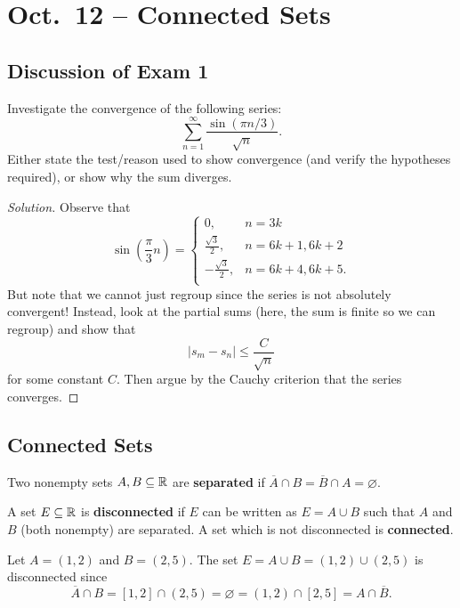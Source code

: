 \chapter{Oct.~12 -- Connected Sets}

\section{Discussion of Exam 1}
\begin{exercise}
  Investigate the convergence of the following series:
  \[\sum_{n=1}^\infty \frac{\sin(\pi n / 3)}{\sqrt{n}}.\]
  Either state the test/reason used to show convergence
  (and verify the hypotheses required), or show why the
  sum diverges.
\end{exercise}

\begin{proof}[Solution]
  Observe that
  \[
    \sin\left(\frac{\pi}{3}n\right) = \begin{cases}
      0, & n = 3k\\
      \frac{\sqrt{3}}{2}, & n = 6k + 1, 6k + 2 \\
      -\frac{\sqrt{3}}{2}, & n = 6k + 4, 6k + 5. \\
    \end{cases}
  \]
  But note that we cannot just regroup since the series
  is not absolutely convergent! Instead, look at the partial sums
  (here, the sum is finite so we can regroup)
  and show that
  \[
    |s_m - s_n| \le \frac{C}{\sqrt{n}}
  \]
  for some constant $C$. Then argue by the Cauchy criterion that
  the series converges.
\end{proof}

\section{Connected Sets}
\begin{definition}
  Two nonempty sets $A, B \subseteq \mathbb{R}$ are \textbf{separated}
  if $\overline{A} \cap B = \overline{B} \cap A = \varnothing$.
\end{definition}

\begin{definition}
  A set $E \subseteq \mathbb{R}$ is \textbf{disconnected} if $E$ can be
  written as $E = A \cup B$ such that $A$ and $B$ (both nonempty)
  are separated. A set which is not disconnected is
  \textbf{connected}.
\end{definition}

\begin{example}
  Let $A = (1, 2)$ and $B = (2, 5)$. The set
  $E = A \cup B = (1, 2) \cup (2, 5)$ is disconnected since
  \[\overline{A} \cap B = [1, 2] \cap (2, 5) = \varnothing = (1, 2) \cap [2, 5] = A \cap \overline{B}.\]
\end{example}


